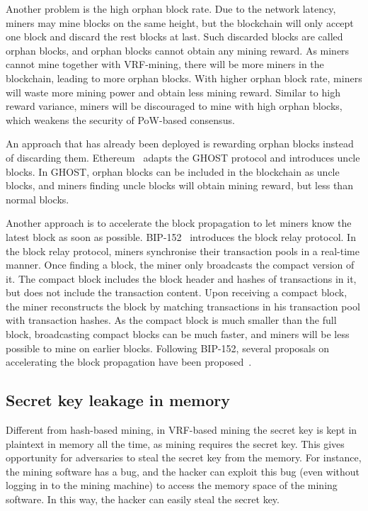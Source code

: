 Another problem is the high orphan block rate.
Due to the network latency, miners may mine blocks on the same height, but the blockchain will only accept one block and discard the rest blocks at last.
Such discarded blocks are called orphan blocks, and orphan blocks cannot obtain any mining reward.
As miners cannot mine together with VRF-mining, there will be more miners in the blockchain, leading to more orphan blocks.
With higher orphan block rate, miners will waste more mining power and obtain less mining reward.
Similar to high reward variance, miners will be discouraged to mine with high orphan blocks, which weakens the security of PoW-based consensus.

An approach that has already been deployed is rewarding orphan blocks instead of discarding them.
Ethereum~\cite{wood2014ethereum} adapts the GHOST protocol and introduces uncle blocks.
In GHOST, orphan blocks can be included in the blockchain as uncle blocks, and miners finding uncle blocks will obtain mining reward, but less than normal blocks.

Another approach is to accelerate the block propagation to let miners know the latest block as soon as possible.
BIP-152~\cite{corallo2016bip} introduces the block relay protocol.
In the block relay protocol, miners synchronise their transaction pools in a real-time manner.
Once finding a block, the miner only broadcasts the compact version of it.
The compact block includes the block header and hashes of transactions in it, but does not include the transaction content.
Upon receiving a compact block, the miner reconstructs the block by matching transactions in his transaction pool with transaction hashes.
As the compact block is much smaller than the full block, broadcasting compact blocks can be much faster, and miners will be less possible to mine on earlier blocks.
Following BIP-152, several proposals on accelerating the block propagation have been proposed~\cite{ozisik2019graphene}\cite{klarman2018bloxroute}\cite{naumenko2019bandwidth}.

\subsection{Secret key leakage in memory}

Different from hash-based mining, in VRF-based mining the secret key is kept in plaintext in memory all the time, as mining requires the secret key. This gives opportunity for adversaries to steal the secret key from the memory. For instance, the mining software has a bug, and the hacker can exploit this bug (even without logging in to the mining machine) to access the memory space of the mining software. In this way, the hacker can easily steal the secret key.

